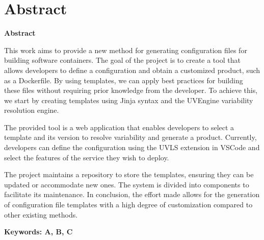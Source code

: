\documentclass[../main.tex]{subfiles}
\begin{document}
\makeatletter
\renewenvironment{abstract}{%
    \if@twocolumn
      \section*{Abstract \\}%
    \else %
    \begin{flushright}
        {\filleft\Huge\bfseries\fontsize{48pt}{12}\selectfont Abstract\vspace{\z@}}%
        \end{flushright}
      \quotation
    \fi}
    {\if@twocolumn\else\endquotation\fi}
\makeatother
\begin{abstract}

  This work aims to provide a new method for generating configuration files for building software containers. The goal of the project is to create a tool that allows developers to define a configuration and obtain a customized product, such as a Dockerfile. By using templates, we can apply best practices for building these files without requiring prior knowledge from the developer. To achieve this, we start by creating templates using Jinja syntax and the UVEngine variability resolution engine.

  The provided tool is a web application that enables developers to select a template and its version to resolve variability and generate a product. Currently, developers can define the configuration using the UVLS extension in VSCode and select the features of the service they wish to deploy.
  
  The project maintains a repository to store the templates, ensuring they can be updated or accommodate new ones. The system is divided into components to facilitate its maintenance. In conclusion, the effort made allows for the generation of configuration file templates with a high degree of customization compared to other existing methods.

\bfseries{\large{Keywords:}} A, B, C

\end{abstract}
\end{document}
